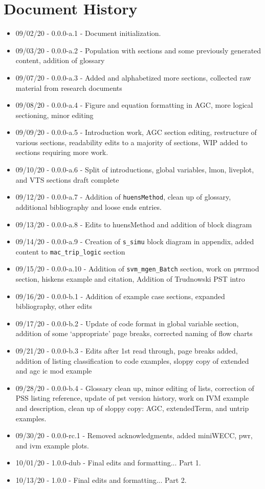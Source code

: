 \chapter{Document History}

\begin{itemize}
\itemsep 0em
\singlespacing
\raggedright
\item 09/02/20 - 0.0.0-a.1 - Document initialization.
\item 09/03/20 - 0.0.0-a.2 - Population with sections and some previously generated content, addition of glossary
\item 09/07/20 - 0.0.0-a.3 - Added and alphabetized more sections, collected raw material from research documents
\item 09/08/20 - 0.0.0-a.4 - Figure and equation formatting in AGC, more logical sectioning, minor editing
\item 09/09/20 - 0.0.0-a.5 - Introduction work, AGC section editing, restructure of various sections, readability edits to a majority of sections, WIP added to sections requiring more work.
\item 09/10/20 - 0.0.0-a.6 - Split of introductions, global variables, lmon, liveplot, and VTS sections draft complete
\item 09/12/20 - 0.0.0-a.7 - Addition of \verb|huensMethod|, clean up of glossary, additional bibliography and loose ends entries.
\item 09/13/20 - 0.0.0-a.8 - Edits to huensMethod and addition of block diagram 
\item 09/14/20 - 0.0.0-a.9 - Creation of \verb|s_simu| block diagram in appendix, added content to \verb|mac_trip_logic| section
\item 09/15/20 - 0.0.0-a.10 - Addition of \verb|svm_mgen_Batch| section, work on pwrmod section, hiskens example and citation, Addition of Trudnowski PST intro
\item 09/16/20 - 0.0.0-b.1 - Addition of example case sections, expanded bibliography, other edits 
\item 09/17/20 - 0.0.0-b.2 - Update of code format in global variable section, addition of some `appropriate' page breaks, corrected naming of flow charts
\item 09/21/20 - 0.0.0-b.3 - Edits after 1st read through, page breaks added, addition of listing classification to code examples, sloppy copy of extended and agc ic mod example
\item 09/28/20 - 0.0.0-b.4 - Glossary clean up, minor editing of lists, correction of PSS listing reference, update of pst version history, work on IVM example and description, clean up of sloppy copy: AGC, extendedTerm, and untrip examples.
\item 09/30/20 - 0.0.0-rc.1 - Removed acknowledgments, added miniWECC, pwr, and ivm example plots.   
\item 10/01/20 - 1.0.0-dub - Final edits and formatting... Part 1.  
\item 10/13/20 - 1.0.0 - Final edits and formatting... Part 2.  
\end{itemize}